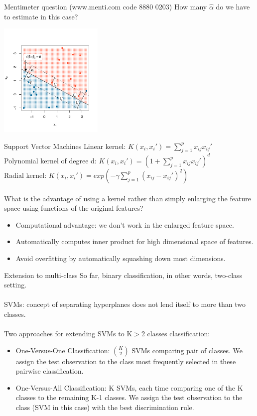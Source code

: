 \documentclass[notes]{beamer}          %
\begin{document}
\begin{frame}{Mentimeter question (www.menti.com code 8880 0203)}
How many $\hat \alpha$ do we have to estimate in this case?
\begin{center}
\includegraphics[height=5.5cm]{../figures/week_2_classification/svm_support_vector_classifier.pdf}  
\end{center}
\end{frame}

\begin{frame}{Support Vector Machines}
Linear kernel: $\mathit{K}(x_i,x_i') = \sum_{j=1}^{p} x_{ij} x_{ij}' $ \\
Polynomial kernel of degree d: $\mathit{K}(x_i,x_i') = (1+ \sum_{j=1}^{p} x_{ij} x_{ij}')^d$\\
Radial kernel: $\mathit{K}(x_i,x_i') = exp(- \gamma \sum_{j=1}^{p} (x_{ij}-x_{ij}')^2)$ \\~\\
What is the advantage of using a kernel rather than simply enlarging the feature space using functions of the original features?
\begin{itemize}
 \item Computational advantage: we don't work in the enlarged feature space.
  \item Automatically computes inner product for high dimensional space of features.
  \item Avoid overfitting by automatically squashing down most dimensions.
\end{itemize}
\end{frame}

\begin{frame}{Extension to multi-class}
So far, binary classification, in other words, two-class setting. \\~\\
SVMs: concept of separating hyperplanes does not lend itself to more than two classes. \\~\\
Two approaches for extending SVMs to K$>$2 classes classification:
\begin{itemize}
 \item One-Versus-One Classification: $\binom{K}{2}$ SVMs comparing pair of classes. We assign the test observation to the class most frequently selected in these pairwise classification.
 \item One-Versus-All Classification: K SVMs, each time comparing one of the K classes to the remaining K-1 classes. We assign the test observation to the class (SVM in this case) with the best discrimination rule. 
\end{itemize}
\end{frame}
\end{document}
